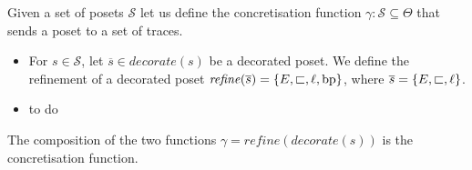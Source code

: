 \begin{definition}
  Given a set of posets $\mathcal{S}$ let us define the concretisation function $\gamma:\mathcal{S}\subseteq\Theta$ that sends a poset to a set of traces.
  \begin{itemize}
  \item For $s\in\mathcal{S}$, let $\overline{s}\in\mathit{decorate}(s)$ be a decorated poset.
    We define the refinement of a decorated poset $\mathit{refine}(\overline{s}) = \{E,\sqsubset,\ell,\operatorname{bp}\}$, where $\overline{s} = \{E,\sqsubset,\ell\}$.
  \item
    \begin{mdframed}[backgroundcolor=blue!20]
      to do
    \end{mdframed}
  \end{itemize}
  The composition of the two functions $\gamma = \mathit{refine}(\mathit{decorate}(s))$ is the concretisation function.
\end{definition}

